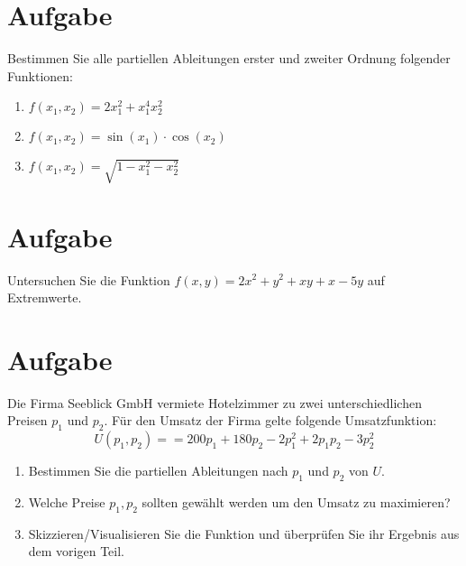\documentclass[fontsize=11pt, parskip=half]{scrartcl}
\begin{document}
\section{Aufgabe}
Bestimmen Sie alle partiellen Ableitungen erster und zweiter Ordnung folgender Funktionen:
\begin{enumerate}[label=\alph*)]
    \item $f(x_1,x_2) = 2x_1^2+x_1^4x_2^2$
    \item $f(x_1,x_2) = \sin ( x_1)\cdot \cos (x_2)$
    \item $f(x_1,x_2) = \sqrt{1-x_1^2-x_2^2}$
\end{enumerate}

\section{Aufgabe}
Untersuchen Sie die Funktion $f(x,y)= 2x ^2 + y^2+xy+x-5y$ auf Extremwerte.

\section{Aufgabe}
Die Firma Seeblick GmbH vermiete Hotelzimmer zu zwei unterschiedlichen Preisen $p_1$ und $p_2$. Für den Umsatz
der Firma gelte folgende Umsatzfunktion:
\[U(p_1,p_2) = = 200p_1 +180p_2 -2p^2_1 +2p_1 p_2 -3p^2_2
    \]
\begin{enumerate}[label=\alph*)]
    \item Bestimmen Sie die partiellen Ableitungen nach $p_1$ und $p_2$ von $U$.
    \item Welche Preise $p_1,p_2$ sollten gewählt werden um den Umsatz zu maximieren?
    \item Skizzieren/Visualisieren Sie die Funktion und überprüfen Sie ihr Ergebnis aus dem vorigen Teil.
\end{enumerate}    
\end{document}
